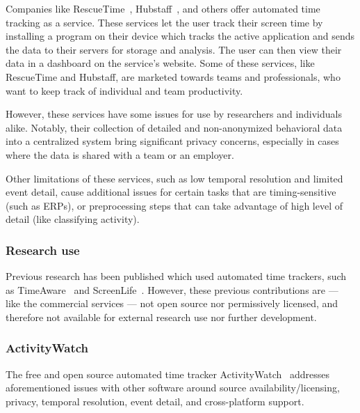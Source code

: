 \documentclass{IEEEtran}
\begin{document}
\begin{refsection}
Companies like RescueTime~\cite{noauthor_rescuetime_nodate}, Hubstaff~\cite{noauthor_hubstaff_nodate}, and others offer automated time tracking as a service. These services let the user track their screen time by installing a program on their device which tracks the active application and sends the data to their servers for storage and analysis. The user can then view their data in a dashboard on the service's website. Some of these services, like RescueTime and Hubstaff, are marketed towards teams and professionals, who want to keep track of individual and team productivity.

However, these services have some issues for use by researchers and individuals alike. Notably, their collection of detailed and non-anonymized behavioral data into a centralized system bring significant privacy concerns, especially in cases where the data is shared with a team or an employer.

Other limitations of these services, such as low temporal resolution and limited event detail, cause additional issues for certain tasks that are timing-sensitive (such as ERPs), or preprocessing steps that can take advantage of high level of detail (like classifying activity).

\subsubsection{Research use}

Previous research has been published which used automated time trackers, such as TimeAware~\cite{kim_timeaware_2016} and ScreenLife~\cite{rooksby_personal_2016}. However, these previous contributions are --- like the commercial services --- not open source nor permissively licensed, and therefore not available for external research use nor further development.

\subsubsection{ActivityWatch}

The free and open source automated time tracker ActivityWatch~\cite{bjareholt_activitywatch_2020} addresses aforementioned issues with other software around source availability/licensing, privacy, temporal resolution, event detail, and cross-platform support.


\end{refsection}
\end{document}
